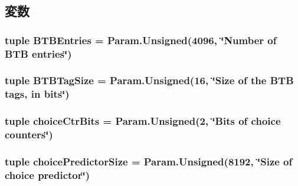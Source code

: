 \subsection{変数}
\hypertarget{classBranchPredictor_1_1BranchPredictor_af08b7bde310be401d556775d6f7022c8}{
\subsubsection[{BTBEntries}]{\setlength{\rightskip}{0pt plus 5cm}tuple {\bf BTBEntries} = Param.Unsigned(4096, \char`\"{}Number of BTB entries\char`\"{})}}
\label{classBranchPredictor_1_1BranchPredictor_af08b7bde310be401d556775d6f7022c8}
\hypertarget{classBranchPredictor_1_1BranchPredictor_ad8cca86a44213bc6d3bd04b3447079d8}{
\subsubsection[{BTBTagSize}]{\setlength{\rightskip}{0pt plus 5cm}tuple {\bf BTBTagSize} = Param.Unsigned(16, \char`\"{}Size of the BTB tags, in bits\char`\"{})}}
\label{classBranchPredictor_1_1BranchPredictor_ad8cca86a44213bc6d3bd04b3447079d8}
\hypertarget{classBranchPredictor_1_1BranchPredictor_ae5455b064804378b4ec6f8094452896d}{
\subsubsection[{choiceCtrBits}]{\setlength{\rightskip}{0pt plus 5cm}tuple {\bf choiceCtrBits} = Param.Unsigned(2, \char`\"{}Bits of choice counters\char`\"{})}}
\label{classBranchPredictor_1_1BranchPredictor_ae5455b064804378b4ec6f8094452896d}
\hypertarget{classBranchPredictor_1_1BranchPredictor_acd59ddeaa888aee8a086f93d0ce0afbc}{
\subsubsection[{choicePredictorSize}]{\setlength{\rightskip}{0pt plus 5cm}tuple {\bf choicePredictorSize} = Param.Unsigned(8192, \char`\"{}Size of choice predictor\char`\"{})}}
